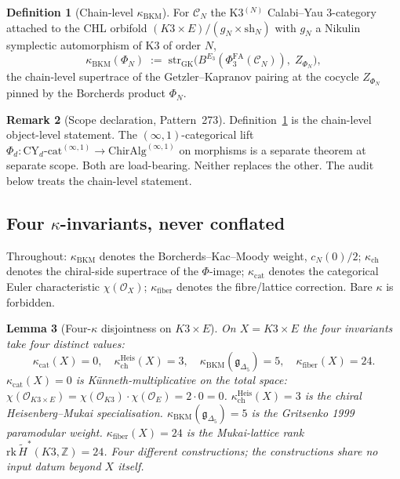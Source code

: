 \documentclass[11pt]{article}
\providecommand{\kBKM}{\kappa_{\mathrm{BKM}}}
\providecommand{\kch}{\kappa_{\mathrm{ch}}}
\providecommand{\kcat}{\kappa_{\mathrm{cat}}}
\providecommand{\kfib}{\kappa_{\mathrm{fiber}}}
\providecommand{\gDelta}{\mathfrak{g}_{\Delta_5}}
\providecommand{\PhiFA}{\Phi^{\mathrm{FA}}}
\newtheorem{lemma}{Lemma}
\theoremstyle{definition}
\newtheorem{definition}[lemma]{Definition}
\newtheorem{remark}[lemma]{Remark}
\begin{document}
\begin{definition}[Chain-level $\kBKM$]
\label{def:kappa-bkm-chain-level}
For $\mathcal C_N$ the K3$^{(N)}$ Calabi--Yau 3-category attached to the
CHL orbifold $(K3 \times E)/(g_N \times \mathrm{sh}_N)$ with $g_N$ a
Nikulin symplectic automorphism of K3 of order $N$,
\[
  \kBKM(\Phi_N) \;:=\;
  \mathrm{str}_{\mathrm{GK}}
    \bigl( B^{E_3}(\PhiFA_3(\mathcal C_N)), \; Z_{\Phi_N} \bigr),
\]
the chain-level supertrace of the Getzler--Kapranov pairing at the
cocycle $Z_{\Phi_N}$ pinned by the Borcherds product $\Phi_N$.
\end{definition}

\begin{remark}[Scope declaration, Pattern~273]
Definition~\ref{def:kappa-bkm-chain-level} is the chain-level
object-level statement. The $(\infty,1)$-categorical lift
$\Phi_d : \mathrm{CY}_d\text{-cat}^{(\infty,1)} \to
\mathrm{ChirAlg}^{(\infty,1)}$ on morphisms is a separate theorem at
separate scope. Both are load-bearing. Neither replaces the other.
The audit below treats the chain-level statement.
\end{remark}

\subsection{Four $\kappa$-invariants, never conflated}

Throughout: $\kBKM$ denotes the Borcherds--Kac--Moody weight,
$c_N(0)/2$;
$\kch$ denotes the chiral-side supertrace of the $\Phi$-image;
$\kcat$ denotes the categorical Euler characteristic
$\chi(\mathcal O_X)$;
$\kfib$ denotes the fibre/lattice correction. Bare $\kappa$ is
forbidden.

\begin{lemma}[Four-$\kappa$ disjointness on $K3 \times E$]
\label{lem:four-kappa-disjoint}
On $X = K3 \times E$ the four invariants take four distinct values:
\[
  \kcat(X) = 0, \quad
  \kch^{\mathrm{Heis}}(X) = 3, \quad
  \kBKM(\gDelta) = 5, \quad
  \kfib(X) = 24.
\]
$\kcat(X) = 0$ is K\"unneth-multiplicative on the total space:
$\chi(\mathcal O_{K3 \times E}) = \chi(\mathcal O_{K3}) \cdot
\chi(\mathcal O_E) = 2 \cdot 0 = 0$.
$\kch^{\mathrm{Heis}}(X) = 3$ is the chiral Heisenberg--Mukai
specialisation.
$\kBKM(\gDelta) = 5$ is the Gritsenko 1999 paramodular weight.
$\kfib(X) = 24$ is the Mukai-lattice rank
$\mathrm{rk}\,\widetilde H^*(K3, \mathbb Z) = 24$.
Four different constructions; the constructions share no input datum
beyond $X$ itself.
\end{lemma}
\end{document}
